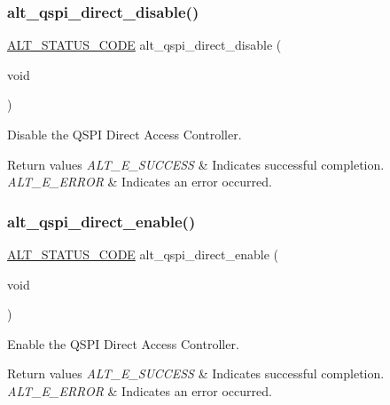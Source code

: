 \subsubsection{\texorpdfstring{alt\_qspi\_direct\_disable()}{alt\_qspi\_direct\_disable()}}
{\footnotesize\ttfamily \mbox{\hyperlink{hwlib_8h_abdb0d369f069723ca55d6c94bcaaaa12}{A\+L\+T\+\_\+\+S\+T\+A\+T\+U\+S\+\_\+\+C\+O\+DE}} alt\+\_\+qspi\+\_\+direct\+\_\+disable (\begin{DoxyParamCaption}\item[{void}]{ }\end{DoxyParamCaption})}

Disable the Q\+S\+PI Direct Access Controller.


\begin{DoxyRetVals}{Return values}
{\em A\+L\+T\+\_\+\+E\+\_\+\+S\+U\+C\+C\+E\+SS} & Indicates successful completion. \\
\hline
{\em A\+L\+T\+\_\+\+E\+\_\+\+E\+R\+R\+OR} & Indicates an error occurred. \\
\hline
\end{DoxyRetVals}
\mbox{\label{group__ALT__QSPI__DAC_gae37eb1b5749d99e70b9cbb59aa02abe3}} 
\subsubsection{\texorpdfstring{alt\_qspi\_direct\_enable()}{alt\_qspi\_direct\_enable()}}
{\footnotesize\ttfamily \mbox{\hyperlink{hwlib_8h_abdb0d369f069723ca55d6c94bcaaaa12}{A\+L\+T\+\_\+\+S\+T\+A\+T\+U\+S\+\_\+\+C\+O\+DE}} alt\+\_\+qspi\+\_\+direct\+\_\+enable (\begin{DoxyParamCaption}\item[{void}]{ }\end{DoxyParamCaption})}

Enable the Q\+S\+PI Direct Access Controller.


\begin{DoxyRetVals}{Return values}
{\em A\+L\+T\+\_\+\+E\+\_\+\+S\+U\+C\+C\+E\+SS} & Indicates successful completion. \\
\hline
{\em A\+L\+T\+\_\+\+E\+\_\+\+E\+R\+R\+OR} & Indicates an error occurred. \\
\hline
\end{DoxyRetVals}
